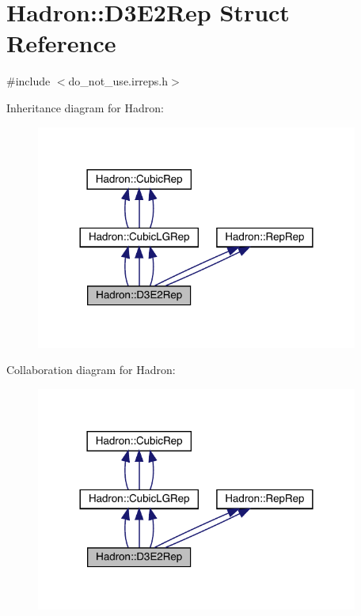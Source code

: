 \hypertarget{structHadron_1_1D3E2Rep}{}\section{Hadron\+:\+:D3\+E2\+Rep Struct Reference}
\label{structHadron_1_1D3E2Rep}


{\ttfamily \#include $<$do\+\_\+not\+\_\+use.\+irreps.\+h$>$}



Inheritance diagram for Hadron\+:
\nopagebreak
\begin{figure}[H]
\begin{center}
\leavevmode
\includegraphics[width=300pt]{d9/d27/structHadron_1_1D3E2Rep__inherit__graph}
\end{center}
\end{figure}


Collaboration diagram for Hadron\+:
\nopagebreak
\begin{figure}[H]
\begin{center}
\leavevmode
\includegraphics[width=300pt]{dd/d71/structHadron_1_1D3E2Rep__coll__graph}
\end{center}
\end{figure}
